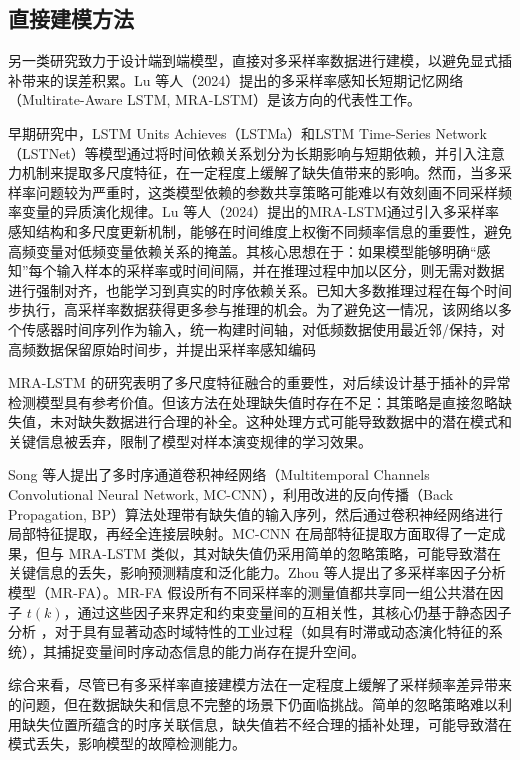\documentclass[bachelor, vlined]{DissertUESTC}
\begin{document}
    \subsection{直接建模方法}

    另一类研究致力于设计端到端模型，直接对多采样率数据进行建模，以避免显式插补带来的误差积累。Lu 等人（2024）提出的多采样率感知长短期记忆网络（Multirate-Aware LSTM, MRA-LSTM）是该方向的代表性工作。

    早期研究中，LSTM Units Achieves（LSTMa）和LSTM Time-Series Network（LSTNet）等模型通过将时间依赖关系划分为长期影响与短期依赖，并引入注意力机制来提取多尺度特征，在一定程度上缓解了缺失值带来的影响。然而，当多采样率问题较为严重时，这类模型依赖的参数共享策略可能难以有效刻画不同采样频率变量的异质演化规律。Lu 等人（2024）提出的MRA-LSTM通过引入多采样率感知结构和多尺度更新机制，能够在时间维度上权衡不同频率信息的重要性，避免高频变量对低频变量依赖关系的掩盖。其核心思想在于：如果模型能够明确“感知”每个输入样本的采样率或时间间隔，并在推理过程中加以区分，则无需对数据进行强制对齐，也能学习到真实的时序依赖关系。已知大多数推理过程在每个时间步执行，高采样率数据获得更多参与推理的机会。为了避免这一情况，该网络以多个传感器时间序列作为输入，统一构建时间轴，对低频数据使用最近邻/保持，对高频数据保留原始时间步，并提出采样率感知编码

    MRA-LSTM 的研究表明了多尺度特征融合的重要性，对后续设计基于插补的异常检测模型具有参考价值。但该方法在处理缺失值时存在不足：其策略是直接忽略缺失值，未对缺失数据进行合理的补全。这种处理方式可能导致数据中的潜在模式和关键信息被丢弃，限制了模型对样本演变规律的学习效果。

    Song 等人提出了多时序通道卷积神经网络（Multitemporal Channels Convolutional Neural Network, MC-CNN），利用改进的反向传播（Back Propagation, BP）算法处理带有缺失值的输入序列，然后通过卷积神经网络进行局部特征提取，再经全连接层映射。MC-CNN 在局部特征提取方面取得了一定成果，但与 MRA-LSTM 类似，其对缺失值仍采用简单的忽略策略，可能导致潜在关键信息的丢失，影响预测精度和泛化能力。Zhou 等人提出了多采样率因子分析模型（MR-FA）。MR-FA 假设所有不同采样率的测量值都共享同一组公共潜在因子 $t(k)$，通过这些因子来界定和约束变量间的互相关性，其核心仍基于静态因子分析 ，对于具有显著动态时域特性的工业过程（如具有时滞或动态演化特征的系统），其捕捉变量间时序动态信息的能力尚存在提升空间。

    综合来看，尽管已有多采样率直接建模方法在一定程度上缓解了采样频率差异带来的问题，但在数据缺失和信息不完整的场景下仍面临挑战。简单的忽略策略难以利用缺失位置所蕴含的时序关联信息，缺失值若不经合理的插补处理，可能导致潜在模式丢失，影响模型的故障检测能力。
\end{document}
